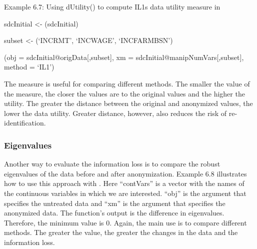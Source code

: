 \documentclass[letterpaper,10pt,english]{sphinxmanual}
\begin{document}
Example 6.7: Using dUtility() to compute IL1s data utility measure in

\begin{DUlineblock}{0em}
\item[] 
\item[] sdcInitial \textless{}- (sdcInitial)
\item[] 
\item[] 
\end{DUlineblock}


\begin{DUlineblock}{0em}
\item[] 
\item[] subset \textless{}- (‘INCRMT’, ‘INCWAGE’, ‘INCFARMBSN’)
\item[] (obj = sdcInitial@origData{[},subset{]}, xm =
sdcInitial@manipNumVars{[},subset{]}, method = ‘IL1’)
\end{DUlineblock}


The measure is useful for comparing different methods. The smaller the
value of the measure, the closer the values are to the original values
and the higher the utility.   The
greater the distance between the original and anonymized values, the
lower the data utility. Greater distance, however, also reduces the risk
of re-identification.


\subsubsection{Eigenvalues}
\label{\detokenize{utility:eigenvalues}}
Another way to evaluate the information loss is to compare the robust
eigenvalues of the data before and after anonymization. Example 6.8
illustrates how to use this approach with . Here “contVars” is
a vector with the names of the continuous variables in which we are
interested. “obj” is the argument that specifies the untreated data and
“xm” is the argument that specifies the anonymized data. The function’s
output is the difference in eigenvalues. Therefore, the minimum value is
0. Again, the main use is to compare different methods. The greater the
value, the greater the changes in the data and the information loss.
\end{document}
